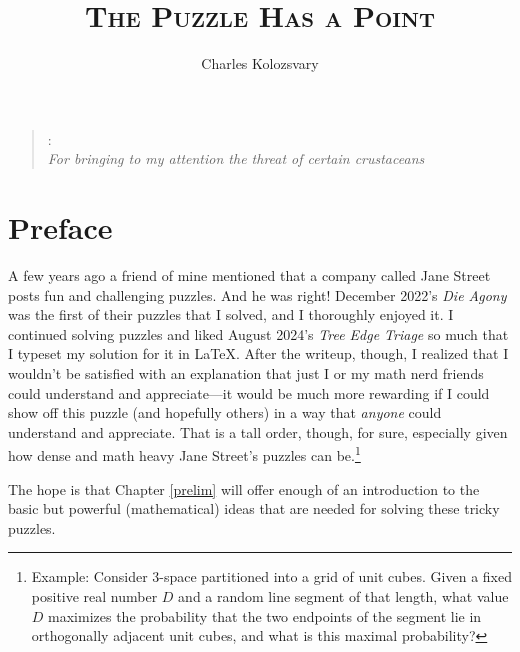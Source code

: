 \documentclass{book}
\theoremstyle{definition}
\theoremstyle{colonstylebf}
\begin{document}
\title{{\centering\Huge\textsc{The Puzzle Has a Point}}}
\author{\Large Charles Kolozsvary}
\date{}

\maketitle

\begin{quote}
{: \\ 
\hfill {\sl For bringing to my attention the threat of certain crustaceans}}
\end{quote}

\chapter*{Preface}

A few years ago a friend of mine mentioned that a company called Jane Street posts fun and challenging puzzles.
And he was right! December 2022's \emph{Die Agony} was the first of their puzzles that I solved, and I thoroughly enjoyed it. I continued solving puzzles and liked August 2024's \emph{Tree Edge Triage} so much that I typeset my solution for it in \LaTeX. After the writeup, though, I realized that
I wouldn't be satisfied with an explanation that just I or my math nerd friends could understand and appreciate---it would be much more rewarding if I could show off this puzzle (and hopefully others) in a way that \emph{anyone} could understand and appreciate. That is a tall order, though, for sure, especially given how dense and math heavy Jane Street's puzzles can be.\footnote{Example: Consider 3-space partitioned into a grid of unit cubes. 
Given a fixed positive real number $D$ and a random line segment of that length,
what value $D$ maximizes the probability that the two endpoints of the
segment lie in orthogonally adjacent unit cubes, and what is this maximal
probability?}

The hope is that Chapter \ref{prelim} will offer enough of an introduction to the basic but powerful (mathematical) ideas that are needed for solving these tricky puzzles. 

\end{document}
